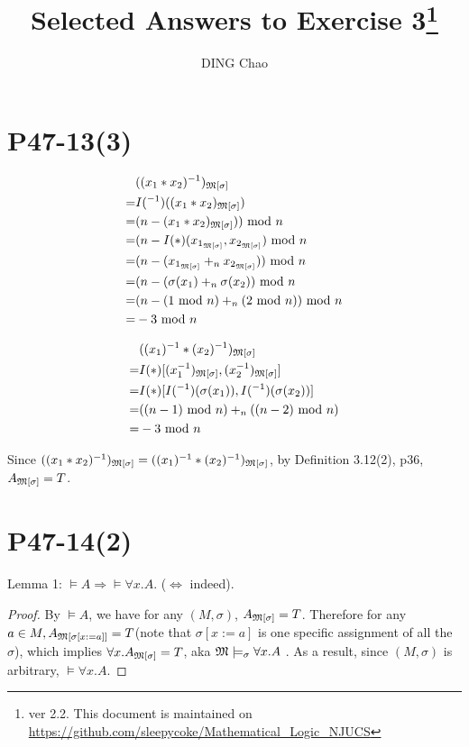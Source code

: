 \documentclass{article}
\author{DING Chao}
\title{Selected Answers to Exercise 3\footnote{ver 2.2. This document is maintained on \url{https://github.com/sleepycoke/Mathematical_Logic_NJUCS}}}
\begin{document}
\maketitle
\section{P47-13(3)}
\begin{align*}
	 &((x_1*x_2)^{-1})_{\frak{M}[\sigma]}\\
	=&I(^{-1})((x_1*x_2)_{\frak{M}[\sigma]})\\
	=&(n - (x_1*x_2)_{\frak{M}[\sigma]})) \mbox{ mod } n\\
	=&(n - I(*)(x_{1_{\frak{M}[\sigma]}}, x_{2_{\frak{M}[\sigma]}})\text{ mod } n\\
	=&(n - (x_{1_{\frak{M}[\sigma]}} +_n x_{2_{\frak{M}[\sigma]}})) \mbox{ mod } n\\
	=&(n - (\sigma(x_1) +_n \sigma(x_2))  \mbox{ mod }  n\\
	=&(n - (1  \text{ mod }  n) +_n (2  \text{ mod }   n) )  \mbox{ mod }  n\\
	=&-3  \mbox{ mod }  n
\end{align*}

\bigbreak

\begin{align*}
&((x_1)^{-1}*(x_2)^{-1})_{\frak{M}[\sigma]}\\
=&I(*)[(x_1^{-1})_{\frak{M}[\sigma]}, (x_2^{-1})_{\frak{M}[\sigma]}]\\
=&I(*)[I(^{-1})(\sigma(x_1)), I(^{-1})(\sigma(x_2))]\\
=&((n - 1) \mbox{ mod } n) +_n ((n - 2) \mbox{ mod } n)\\
=&-3 \mbox{ mod } n
\end{align*}

Since $((x_1*x_2)^{-1})_{\frak{M}[\sigma]} = ((x_1)^{-1}*(x_2)^{-1})_{\frak{M}[\sigma]}$, by Definition 3.12(2), p36, $A_{\frak{M}[\sigma]} = T$. 

\section{P47-14(2)}
Lemma 1: $\models A \Rightarrow \models \forall x. A$. ($\Leftrightarrow$ indeed).

\begin{proof}
	By $\models A$, we have for any $(M, \sigma)$, $A_{\frak{M}[\sigma]} = T$. Therefore for any $a \in M, A_{\frak{M}[\sigma[x:=a]]} = T$(note that $\sigma[x:=a]$ is one specific assignment of all the $\sigma$), 	which implies $\forall x.A _{\frak{M}[\sigma]} = T$, aka $\frak{M} \models _\sigma \forall x.A$ . As a result, since $(M, \sigma)$ is arbitrary, $\models \forall x. A$. 
\end{proof}
\end{document}

